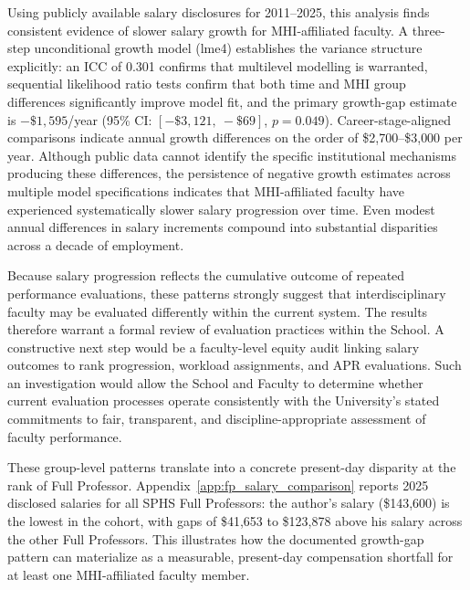 \documentclass{article}
\newcommand{\DataMinYear}{2011}
\newcommand{\DataMaxYear}{2025}
\begin{document}
Using publicly available salary disclosures for \DataMinYear--\DataMaxYear, this analysis finds consistent evidence of slower salary growth for MHI-affiliated faculty. A three-step unconditional growth model (lme4) establishes the variance structure explicitly: an ICC of 0.301 confirms that multilevel modelling is warranted, sequential likelihood ratio tests confirm that both time and MHI group differences significantly improve model fit, and the primary growth-gap estimate is \(-\$1{,}595\)/year (95\% CI: \([-\$3{,}121,\ -\$69]\), \(p = 0.049\)). Career-stage-aligned comparisons indicate annual growth differences on the order of \$2{,}700–\$3{,}000 per year. Although public data cannot identify the specific institutional mechanisms producing these differences, the persistence of negative growth estimates across multiple model specifications indicates that MHI-affiliated faculty have experienced systematically slower salary progression over time. Even modest annual differences in salary increments compound into substantial disparities across a decade of employment.

Because salary progression reflects the cumulative outcome of repeated performance evaluations, these patterns strongly suggest that interdisciplinary faculty may be evaluated differently within the current system. The results therefore warrant a formal review of evaluation practices within the School. A constructive next step would be a faculty-level equity audit linking salary outcomes to rank progression, workload assignments, and APR evaluations. Such an investigation would allow the School and Faculty to determine whether current evaluation processes operate consistently with the University's stated commitments to fair, transparent, and discipline-appropriate assessment of faculty performance.

These group-level patterns translate into a concrete present-day disparity at the rank of Full Professor. Appendix~\ref{app:fp_salary_comparison} reports 2025 disclosed salaries for all SPHS Full Professors: the author's salary (\$143{,}600) is the lowest in the cohort, with gaps of \$41{,}653 to \$123{,}878 above his salary across the other Full Professors. This illustrates how the documented growth-gap pattern can materialize as a measurable, present-day compensation shortfall for at least one MHI-affiliated faculty member.







\clearpage
\renewcommand{\thesection}{\arabic{section}}
\setcounter{section}{0}
\end{document}
